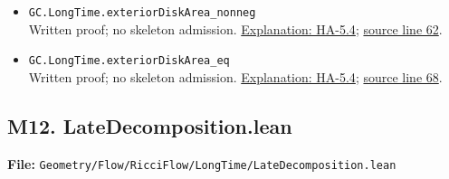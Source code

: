 \documentclass[
  letterpaper,
  11pt]{article}
\begin{document}
\begin{itemize}
{  line 57}.
\item
  {\small\texttt{GC.\allowbreak{}Long\allowbreak{}Time.\allowbreak{}exterior\allowbreak{}Disk\allowbreak{}Area\_\allowbreak{}nonneg}}\\
  Written proof; no skeleton admission. \hyperref[ha-5-4]{Explanation:
  HA-5.4};
  \href{https://github.com/qinz1yang/differential-geometry-dev/blob/ea0fae60ee01ef8c8d9b57a51794c6538f679c5d/DifferentialGeometry/Geometry/Flow/RicciFlow/LongTime/ExteriorDiskFlow.lean\#L62}{source
  line 62}.
\item
  {\small\texttt{GC.\allowbreak{}Long\allowbreak{}Time.\allowbreak{}exterior\allowbreak{}Disk\allowbreak{}Area\_\allowbreak{}eq}}\\
  Written proof; no skeleton admission. \hyperref[ha-5-4]{Explanation:
  HA-5.4};
  \href{https://github.com/qinz1yang/differential-geometry-dev/blob/ea0fae60ee01ef8c8d9b57a51794c6538f679c5d/DifferentialGeometry/Geometry/Flow/RicciFlow/LongTime/ExteriorDiskFlow.lean\#L68}{source
  line 68}.
\end{itemize}


\subsection{M12.
LateDecomposition.lean}\label{m12.-latedecomposition.lean}

\textbf{File:}
{\small\texttt{Geometry/\allowbreak{}Flow/\allowbreak{}Ricci\allowbreak{}Flow/\allowbreak{}Long\allowbreak{}Time/\allowbreak{}Late\allowbreak{}Decomposition.\allowbreak{}lean}}
\end{document}
